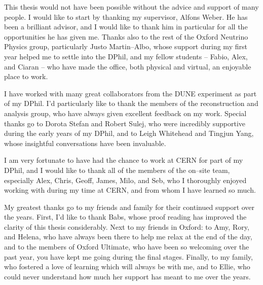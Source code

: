 This thesis would not have been possible without the advice and support of many
people. I would like to start by thanking my supervisor, Alfons Weber. He has
been a brilliant advisor, and I would like to thank him in particular for all
the opportunities he has given me. Thanks also to the rest of the Oxford
Neutrino Physics group, particularly Justo Martin--Albo, whose support during 
my first year helped me to settle into the DPhil, and my fellow students -- 
Fabio, Alex, and Ciaran -- who have made the office, both physical and 
virtual, an enjoyable place to work.

\medskip\noindent
I have worked with many great collaborators from the DUNE experiment
as part of my DPhil. I'd particularly like to thank the members of the 
\protodune{} reconstruction and analysis group, who have always given 
excellent feedback on my work. Special thanks go to Dorota Stefan and Robert 
Sulej, who were incredibly supportive during the early years of my DPhil, and 
to Leigh Whitehead and Tingjun Yang, whose insightful conversations have been 
invaluable. 

\medskip\noindent
I am very fortunate to have had the chance to work at CERN for part of my DPhil,
and I would like to thank all of the members of the on--site \protodune{} 
team, especially Alex, Chris, Geoff, James, Milo, and Seb, who I thoroughly 
enjoyed working with during my time at CERN, and from whom I have learned so 
much. 

\medskip\noindent
My greatest thanks go to my friends and family for their continued support 
over the years. First, I'd like to thank Babs, whose proof reading has improved 
the clarity of this thesis considerably. Next to my friends in Oxford: to Amy, 
Rory, and Helena, who have always been there to help me relax at the end of the 
day, and to the members of Oxford Ultimate, who have been so welcoming over the 
past year, you have kept me going during the final stages. Finally, to my 
family, who fostered a love of learning which will always be with me, and to 
Ellie, who could never understand how much her support has meant to me over the 
years.

